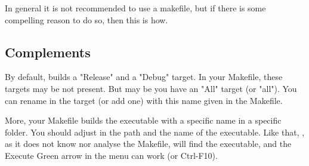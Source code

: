 
In general it is not recommended to use a makefile, but if there is some compelling reason to do so, then this is how. 

\subsection{Complements}

By default, \codeblocks builds a "Release" and a "Debug" target. In your Makefile, these targets may be not present. But may be you have an "All" target (or "all"). You can rename in \codeblocks the target (or add one) with this name given in the Makefile. 

More, your Makefile builds the executable with a specific name in a specific folder. You should adjust in \codeblocks the path and the name of the executable. Like that, \codeblocks, as it does not know nor analyse the Makefile, will find the executable, and the Execute Green arrow in the menu can work (or Ctrl-F10).

